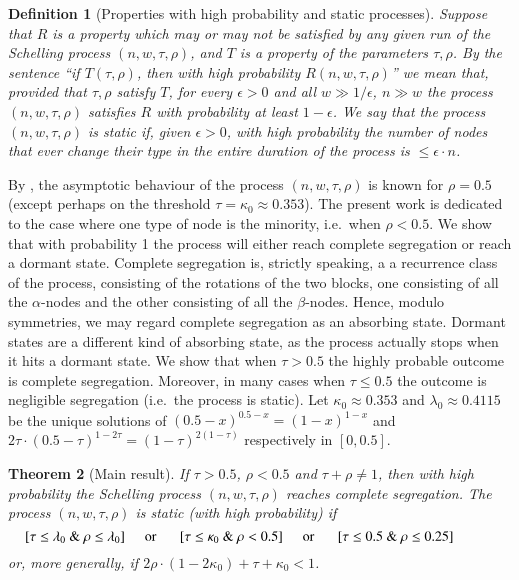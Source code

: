 \documentclass[11pt]{article}
\theoremstyle{plain}
\newtheorem{thm}{Theorem}[section]
\newtheorem{defi}[thm]{Definition}
\numberwithin{equation}{subsection}
\begin{document}
\begin{defi}[Properties with high probability and static processes]\label{de:prophighprob}\label{defi:staticproc}
Suppose that $R$ is a property which may or may not be satisfied by 
any given run of the Schelling process
$(n, w, \tau, \rho)$, and $T$ is a property of 
the parameters $\tau, \rho$. By the sentence
``if $T(\tau, \rho)$, then with high probability $R(n, w, \tau, \rho)$''
we mean that, provided that $\tau, \rho$ satisfy $T$, 
for every $\epsilon>0$ and
all $w\gg 1/\epsilon$, $n\gg w$ the process
$(n, w, \tau, \rho)$ satisfies $R$ with probability at least $1-\epsilon$.
We say that the process $(n,w,\tau,\rho)$ is static if, given $\epsilon>0$,
with high probability the number of
nodes that ever change their type 
in the entire duration of the process is $\leq\epsilon \cdot n$.
\end{defi}

By  \cite{brandt:an,BELschel13},
 the asymptotic behaviour of the process $(n,w,\tau,\rho)$
 is known for $\rho=0.5$ (except perhaps on the threshold
 $\tau=\kappa_0\approx 0.353$). The present work is dedicated to the case
 where one type of node is the minority, i.e.\ when $\rho<0.5$. 
We show that with probability 1 the process will either reach complete segregation
 or reach a dormant state. Complete segregation is, strictly speaking, 
 a a recurrence class of the process, consisting of the rotations of the two 
 blocks, one consisting of all the $\alpha$-nodes and the other consisting of all the $\beta$-nodes.
 Hence, modulo symmetries, we may regard complete segregation as
 an absorbing state. Dormant states are a different kind of absorbing state, as the process
 actually stops when it hits a dormant state.
We show that  when $\tau>0.5$ the highly probable outcome is complete segregation.
Moreover, in many cases when $\tau\leq 0.5$ the outcome is negligible segregation
(i.e.\ the process is static).
Let $\kappa_0\approx 0.353$ and $\lambda_0\approx  0.4115$
be 
the unique solutions of 
$\left( 0.5-x \right)^{0.5-x} = \left( 1-x \right)^{1-x}$
and
$2\tau \cdot \left(0.5-\tau\right)^{1-2\tau}= (1-\tau)^{2(1-\tau)}$
respectively in $[0,0.5]$.
 
\begin{thm}[Main result]\label{th:complsegm}
If $\tau>0.5$, $\rho<0.5$ and $\tau+\rho\neq 1$, then with high probability the
Schelling process $(n,w,\tau,\rho)$ 
reaches complete segregation.  
The process $(n, w, \tau, \rho)$ is static (with high probability) if
\[
\parbox{12cm}{\textup{
[$\tau\leq \lambda_0$ \& $\rho\leq \lambda_0$]\hspace{0.5cm}or\hspace{0.5cm}
[$\tau\leq \kappa_0$ \& $\rho<0.5$]\hspace{0.5cm}or\hspace{0.5cm}
[$\tau\leq 0.5$ \& $\rho\leq 0.25$]}
}
\]
or, more generally, if 
$2\rho \cdot (1-2\kappa_0)+\tau +\kappa_0<1$.
\end{thm} 
\end{document}
